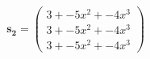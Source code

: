 \documentclass[preview]{standalone}
\begin{document}
\begin{align*}
\mathbf{s_2} = \begin{pmatrix}3 + -5x^{2} + -4x^{3} \\ 3 + -5x^{2} + -4x^{3} \\ 3 + -5x^{2} + -4x^{3}\end{pmatrix}
\end{align*}
\end{document}
